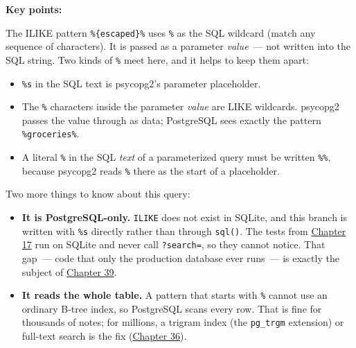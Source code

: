 \begin{codebox}
\begin{Shaded}
\begin{Highlighting}[]
\OperatorTok{=}\NormalTok{ [row\_to\_note(row) }\NormalTok{ cursor.fetchall()]}
    \NormalTok{: }
\end{Highlighting}
\end{Shaded}

\end{codebox}

\noindent{}\textbf{Key points:}

The ILIKE pattern \texttt{\%\{escaped\}\%} uses \texttt{\%} as the SQL wildcard (match any sequence of characters). It is passed as a parameter \emph{value}~--- not written into the SQL string. Two kinds of \texttt{\%} meet here, and it helps to keep them apart:

\begin{itemize}
\tightlist
\item
  \texttt{\%s} in the SQL text is psycopg2's parameter placeholder.
\item
  The \texttt{\%} characters inside the parameter \emph{value} are LIKE wildcards. psycopg2 passes the value through as data; PostgreSQL sees exactly the pattern \texttt{\%groceries\%}.
\item
  A literal \texttt{\%} in the SQL \emph{text} of a parameterized query must be written \texttt{\%\%}, because psycopg2 reads \texttt{\%} there as the start of a placeholder.
\end{itemize}

\noindent{}Two more things to know about this query:

\begin{itemize}
\tightlist
\item
  \textbf{It is PostgreSQL-only.} \texttt{ILIKE} does not exist in SQLite, and this branch is written with \texttt{\%s} directly rather than through \texttt{sql()}. The tests from \hyperref[ch:17-build-process]{Chapter 17} run on SQLite and never call \texttt{?search=}, so they cannot notice. That gap~--- code that only the production database ever runs~--- is exactly the subject of \hyperref[ch:39-local-vs-production]{Chapter 39}.
\item
  \textbf{It reads the whole table.} A pattern that starts with \texttt{\%} cannot use an ordinary B-tree index, so PostgreSQL scans every row. That is fine for thousands of notes; for millions, a trigram index (the \texttt{pg\_trgm} extension) or full-text search is the fix (\hyperref[ch:36-scaling-load]{Chapter 36}).
\end{itemize}

